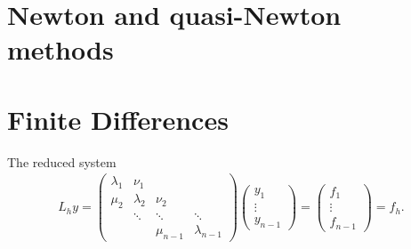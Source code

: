 \documentclass[ignorenonframetext,notheorems,aspectratio=1610]{beamer}
\begin{document}
\section{Newton and quasi-Newton methods}
\frame{}
\frame{}
\frame{}
\frame{}
\frame{}
\frame{}
\frame{}
\frame{}
\frame{}
\frame{}

\section{Finite Differences}

\frame{}
\frame{}
\frame{}
\frame{}
\frame{}
\frame{}
\frame{}
\frame{}
\begin{frame}
  \begin{block}{The reduced system}
    \begin{gather*}
      L_h y =
    \begin{pmatrix}
      \lambda_1 & \nu_1\\
      \mu_2 & \lambda_2 & \nu_2 \\
      & \ddots & \ddots & \ddots \\
      &&\mu_{n-1}& \lambda_{n-1}
    \end{pmatrix}
    \begin{pmatrix}
      y_1\\\vdots\\y_{n-1}
    \end{pmatrix}
    =
    \begin{pmatrix}
      f_1 \\\vdots\\f_{n-1}
    \end{pmatrix} = f_h.
  \end{gather*}
  \end{block}
\end{frame}
\frame{
  }
\frame{}
\frame{}
\frame{}
\frame{}
\frame{}
\frame{}
\frame{}
\frame{}
\frame{}
\frame{}
\frame{}
\frame{}
\frame{}
\frame{}
\frame{}
\end{document}
